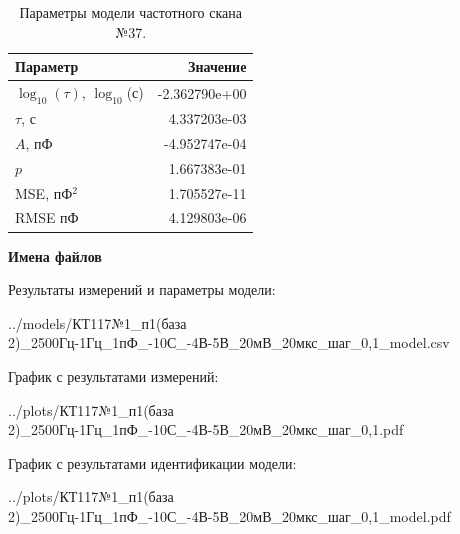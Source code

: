 \begin{table}[!ht]
    \centering
    \caption{Параметры модели частотного скана №37.}
    \begin{tabular}{|l|r|}
        \hline
        Параметр                                       & Значение                  \\ \hline
        $\log_{10}(\tau)$, $\log_{10}$(с)              & -2.362790e+00             \\ \hline
        $\tau$, с                                      & 4.337203e-03              \\ \hline
        $A$, пФ                                        & -4.952747e-04             \\ \hline
        $p$                                            & 1.667383e-01              \\ \hline
        MSE, пФ$^2$                                    & 1.705527e-11              \\ \hline
        RMSE пФ                                        & 4.129803e-06              \\ \hline
    \end{tabular}
    \label{table:frequency_scan_model_37}
\end{table}

\textbf{Имена файлов}

Результаты измерений и параметры модели:

\scriptsize../models/КТ117№1\_п1(база 2)\_2500Гц-1Гц\_1пФ\_-10С\_-4В-5В\_20мВ\_20мкс\_шаг\_0,1\_model.csv
\normalsize

График с результатами измерений:

\scriptsize../plots/КТ117№1\_п1(база 2)\_2500Гц-1Гц\_1пФ\_-10С\_-4В-5В\_20мВ\_20мкс\_шаг\_0,1.pdf
\normalsize

График с результатами идентификации модели:

\scriptsize../plots/КТ117№1\_п1(база 2)\_2500Гц-1Гц\_1пФ\_-10С\_-4В-5В\_20мВ\_20мкс\_шаг\_0,1\_model.pdf
\normalsize

